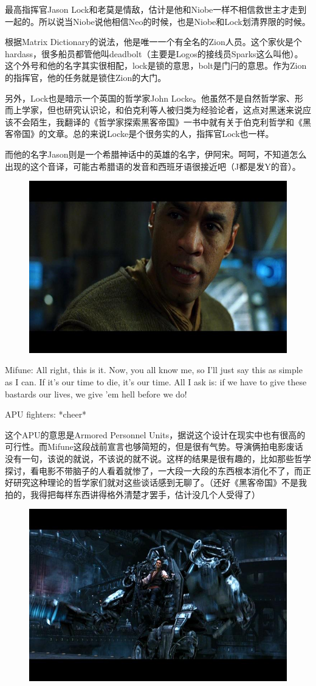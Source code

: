 \documentclass[UTF8]{ctexart}
\newenvironment{myquote}{\color{green} \setlength{\leftskip}{6em} \setlength{\rightskip}{4em} \setlength{\parindent}{-2em}}{\par}
\begin{document}
最高指挥官Jason Lock和老莫是情敌，估计是他和Niobe一样不相信救世主才走到一起的。所以说当Niobe说他相信Neo的时候，也是Niobe和Lock划清界限的时候。

根据Matrix Dictionary的说法，他是唯一一个有全名的Zion人员。这个家伙是个hardass，很多船员都管他叫deadbolt（主要是Logos的接线员Sparks这么叫他）。这个外号和他的名字其实很相配，lock是锁的意思，bolt是门闩的意思。作为Zion的指挥官，他的任务就是锁住Zion的大门。

另外，Lock也是暗示一个英国的哲学家John Locke。他虽然不是自然哲学家、形而上学家，但也研究认识论，和伯克利等人被归类为经验论者，这点对黑迷来说应该不会陌生，我翻译的《哲学家探索黑客帝国》一书中就有关于伯克利哲学和《黑客帝国》的文章。总的来说Locke是个很务实的人，指挥官Lock也一样。

而他的名字Jason则是一个希腊神话中的英雄的名字，伊阿宋。呵呵，不知道怎么出现的这个音译，可能古希腊语的发音和西班牙语很接近吧（J都是发Y的音）。

\begin{figure}[htb]
\centering
\includegraphics[width=0.5\linewidth]{fig/5fe264383ee43a2397ddd8f2.jpg}
\end{figure}

\begin{myquote}
Mifune: All right, this is it. Now, you all know me, so I'll just say this as simple as I can. If it's our time to die, it's our time. All I ask is: if we have to give these bastards our lives, we give 'em hell before we do!

APU fighters: *cheer*
\end{myquote}

这个APU的意思是Armored Personnel Units，据说这个设计在现实中也有很高的可行性。而Mifune这段战前宣言也够简短的，但是很有气势。导演俩拍电影废话没有一句，该说的就说，不该说的就不说。这样的结果是很有趣的，比如那些哲学探讨，看电影不带脑子的人看着就惨了，一大段一大段的东西根本消化不了，而正好研究这种理论的哲学家们就对这些谈话感到无聊了。（还好《黑客帝国》不是我拍的，我得把每样东西讲得格外清楚才罢手，估计没几个人受得了）

\begin{figure}[htb]
\centering
\includegraphics[width=0.5\linewidth]{fig/385658828a847ba20cf4d2f2.jpg}
\end{figure}
\end{document}
